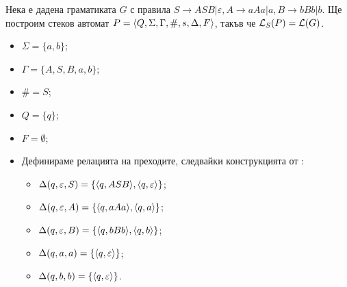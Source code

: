 \begin{example}
  Нека е дадена граматиката $G$ с правила 
  $S\rightarrow ASB\vert \varepsilon, A\rightarrow aAa\vert a, B\rightarrow bBb\vert b$.
  Ще построим стеков автомат $P = \langle{Q,\Sigma,\Gamma,\#,s,\Delta,F}\rangle$, такъв че $\mathcal{L}_S(P) = \mathcal{L}(G)$.
  \begin{itemize}
  \item
    $\Sigma = \{a,b\}$;
  \item 
    $\Gamma = \{A,S,B,a,b\}$;
  \item
    $\# = S$;
  \item
    $Q = \{q\}$;
  \item
    $F = \emptyset$;
  \item
    Дефинираме релацията на преходите, следвайки конструкцията от :
    \begin{itemize}
    \item 
      $\Delta(q,\varepsilon, S) = \{\langle{q,ASB}\rangle, \langle{q,\varepsilon}\rangle\}$;
    \item
      $\Delta(q, \varepsilon, A) = \{\langle{q, aAa}\rangle, \langle{q, a}\rangle\}$;
    \item
      $\Delta(q, \varepsilon, B) = \{\langle{q, bBb}\rangle, \langle{q, b}\rangle\}$;
    \item
      $\Delta(q, a, a) = \{\langle{q,\varepsilon}\rangle\}$;
    \item
      $\Delta(q, b, b) = \{\langle{q,\varepsilon}\rangle\}$.
    \end{itemize}
  \end{itemize}
\end{example}


